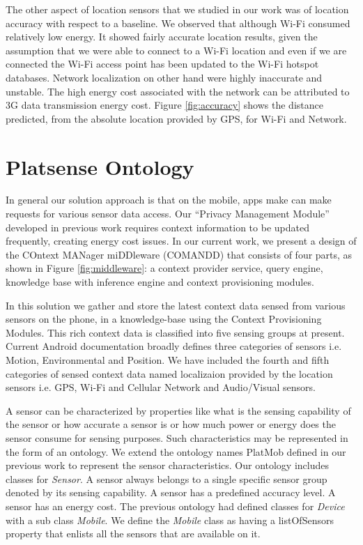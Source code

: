 \documentclass{ubicomp2013}
\begin{document}
The other aspect of location sensors that we studied in our work was of location accuracy with respect to a baseline. We observed that although Wi-Fi consumed relatively low energy. It showed fairly accurate location results, given the assumption that we were able to connect to a Wi-Fi location and even if we are connected the Wi-Fi access point has been updated to the Wi-Fi hotspot databases. Network localization on other hand were highly inaccurate and unstable. The high energy cost associated with the network can be attributed to 3G data transmission energy cost. Figure \ref{fig:accuracy} shows the distance predicted, from the absolute location provided by GPS, for Wi-Fi and Network.

\section{Platsense Ontology}
In general our solution approach is that on the mobile, apps make can make requests for various sensor data access. Our ``Privacy Management Module'' developed in previous work \cite{ghosh2012ms, ghosh2012privacy} requires context information to be updated frequently, creating energy cost issues. In our current work, we present a design of the COntext MANager miDDleware (COMANDD) that consists of four parts, as shown in Figure \ref{fig:middleware}:
a context provider service, query engine, knowledge base with inference engine and context provisioning modules.

In this solution we gather and store the latest context data sensed from various sensors on the phone, in a knowledge-base using the Context Provisioning Modules. This rich context data is classified into five sensing groups at present. Current Android documentation broadly defines three categories of sensors i.e. Motion, Environmental and Position. We have included the fourth and fifth categories of sensed context data named localizaion provided by the location sensors i.e. GPS, Wi-Fi and Cellular Network and Audio/Visual sensors.

A sensor can be characterized by properties like what is the sensing capability of the sensor or how accurate a sensor is or how much power or energy does the sensor consume for sensing purposes. Such characteristics may be represented in the form of an ontology. We extend the ontology names PlatMob defined in our previous work \cite{ghosh2012ms,ghosh2012privacy} to represent the sensor characteristics. Our ontology includes classes for {\em Sensor}. A sensor always belongs to a single specific sensor group denoted by its sensing capability. A sensor has a predefined accuracy level. A sensor has an energy cost. The previous ontology had defined classes for {\em Device} with a sub class {\em Mobile}. We define the {\em Mobile} class as having a listOfSensors property that enlists all the sensors that are available on it. 
\end{document}

